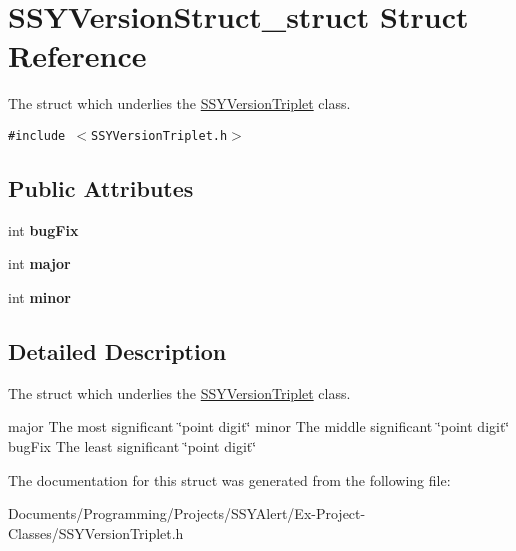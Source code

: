 \hypertarget{struct_s_s_y_version_struct__struct}{
\section{SSYVersionStruct\_\-struct Struct Reference}
\label{struct_s_s_y_version_struct__struct}
}
The struct which underlies the \hyperlink{interface_s_s_y_version_triplet}{SSYVersionTriplet} class.  


{\tt \#include $<$SSYVersionTriplet.h$>$}

\subsection*{Public Attributes}
\begin{CompactItemize}
\item 
\hypertarget{struct_s_s_y_version_struct__struct_3bf5903b7f716bf0316280982eafe486}{
int \textbf{bugFix}}
\label{struct_s_s_y_version_struct__struct_3bf5903b7f716bf0316280982eafe486}

\item 
\hypertarget{struct_s_s_y_version_struct__struct_f1fb569de9b739c0195ae90488918541}{
int \textbf{major}}
\label{struct_s_s_y_version_struct__struct_f1fb569de9b739c0195ae90488918541}

\item 
\hypertarget{struct_s_s_y_version_struct__struct_146e3fb90c0c48f7b6581bdf89dd27b0}{
int \textbf{minor}}
\label{struct_s_s_y_version_struct__struct_146e3fb90c0c48f7b6581bdf89dd27b0}

\end{CompactItemize}


\subsection{Detailed Description}
The struct which underlies the \hyperlink{interface_s_s_y_version_triplet}{SSYVersionTriplet} class. 

major The most significant \char`\"{}point digit\char`\"{}  minor The middle significant \char`\"{}point digit\char`\"{}  bugFix The least significant \char`\"{}point digit\char`\"{} 

The documentation for this struct was generated from the following file:\begin{CompactItemize}
\item 
Documents/Programming/Projects/SSYAlert/Ex-Project-Classes/SSYVersionTriplet.h\end{CompactItemize}
